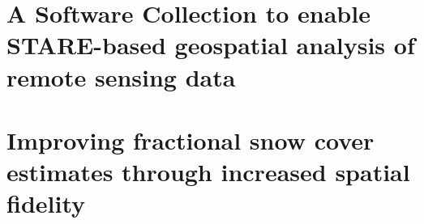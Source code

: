 \documentclass[oneside,11pt,final]{sty/ucthesis-CA2012}
\begin{document}
\begin{mainmatter}
\chapter{A Software Collection to enable STARE-based geospatial analysis of remote sensing data}
\label{Chapter_Software}
\glsresetall


\chapter{Improving fractional snow cover estimates through increased spatial fidelity}
\label{chapter_3}
\glsresetall





\end{mainmatter}

\ssp
%
%
\printbibliography
\end{document}
